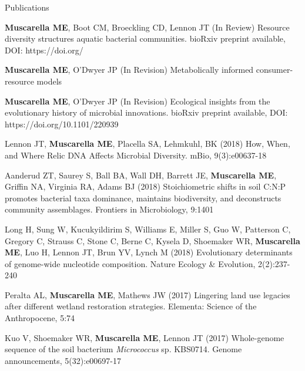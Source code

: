 \documentclass{resume} %
\begin{document}
\begin{rSection}{Publications}

{\bf Muscarella ME}, Boot CM, Broeckling CD, Lennon JT (In Review) Resource diversity structures aquatic bacterial communities. bioRxiv
preprint available, DOI: https://doi.org/

{\bf Muscarella ME}, O'Dwyer JP (In Revision) Metabolically informed consumer-resource models

{\bf Muscarella ME}, O'Dwyer JP (In Revision) Ecological insights from the
evolutionary history of microbial innovations. bioRxiv
preprint available, DOI: https://doi.org/10.1101/220939

Lennon JT, {\bf Muscarella ME}, Placella SA, Lehmkuhl, BK (2018)
How, When, and Where Relic DNA Affects Microbial Diversity.
mBio, 9(3):e00637-18

Aanderud ZT, Saurey S, Ball BA, Wall DH, Barrett JE, {\bf Muscarella ME},
Griffin NA, Virginia RA, Adams BJ (2018)
Stoichiometric shifts in soil C:N:P promotes bacterial taxa dominance,
maintains biodiversity, and deconstructs community assemblages.
Frontiers in Microbiology, 9:1401

Long H, Sung W, Kucukyildirim S, Williams E, Miller S, Guo W, Patterson C,
Gregory C, Strauss C, Stone C, Berne C, Kysela D, Shoemaker WR, {\bf Muscarella
ME}, Luo H, Lennon JT, Brun YV, Lynch M (2018) Evolutionary determinants of
genome-wide nucleotide composition. Nature Ecology \& Evolution, 2(2):237-240

Peralta AL, {\bf Muscarella ME}, Mathews JW (2017) Lingering land use
legacies after different wetland restoration strategies.
Elementa: Science of the Anthropocene, 5:74

Kuo V, Shoemaker WR, {\bf Muscarella ME}, Lennon JT (2017) Whole-genome sequence
of the soil bacterium {\em Micrococcus} sp. KBS0714.
Genome announcements, 5(32):e00697-17


\end{rSection}
\end{document}
